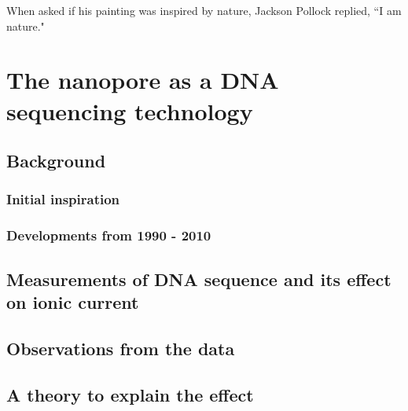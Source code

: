 \begin{savequote}[75mm]
When asked if his painting was inspired by nature, Jackson Pollock replied, ``I am nature."
\end{savequote}

\chapter{The nanopore as a DNA sequencing technology}
\label{dna_sequencing}

\section{Background}

\subsection{Initial inspiration}

\subsection{Developments from 1990 - 2010}

\section{Measurements of DNA sequence and its effect on ionic current}

\section{Observations from the data}

\section{A theory to explain the effect}